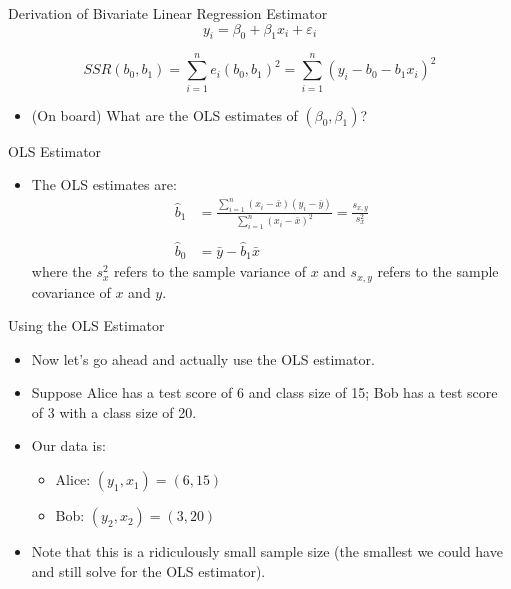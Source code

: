 

\begin{frame}{Derivation of Bivariate Linear Regression Estimator}
\[
	y_i = \beta_0 + \beta_1 x_i + \varepsilon_i
	\]

\[
		SSR\left(b_0,b_1\right) = \sum_{i=1}^{n} e_i \left(b_0,b_1\right)^2  =  \sum_{i=1}^{n} \left(y_i - b_{0} - b_{1} x_{i}\right)^{2} 
	\]


	\begin{itemize}
		\item (On board) What are the OLS estimates of $\left(\beta_0,\beta_1\right)$?
	\end{itemize}
\end{frame}

\begin{frame}{OLS Estimator}
	\begin{itemize}
\item The OLS estimates are:
\begin{align*}
\hat{b}_1 &=\frac{\sum\limits_{i=1}^n(x_i-\bar{x})(y_i-\bar{y})}{\sum\limits_{i=1}^n(x_i-\bar{x})^2}=\frac{s_{x,y}}{s_{x}^{2}} \\
\\
\hat{b}_0 & = \bar{y} - \hat{b}_1 \bar{x}
\end{align*}
where the $s_{x}^{2}$ refers to the sample variance of $x$ and $s_{x,y}$ refers to the sample covariance of $x$ and $y$.

	\end{itemize}
\end{frame}


\begin{frame}{Using the OLS Estimator}
\begin{itemize}
\item Now let's go ahead and actually use the OLS estimator.
\medskip
\item Suppose Alice has a test score of 6 and class size of 15; Bob has a test score of 3 with a class size of 20. 
\medskip
\item Our data is:
\begin{itemize}
\item Alice: $(y_1,x_1)=(6,15)$
\item Bob: $(y_2,x_2)=(3,20)$
\end{itemize}

\item Note that this is  a ridiculously small sample size (the smallest we could have and still solve for the OLS estimator). 
\end{itemize}
\end{frame}

